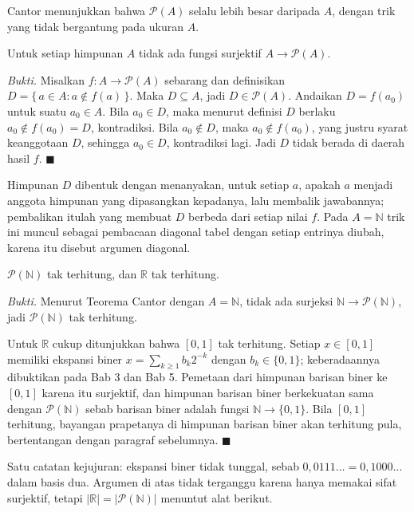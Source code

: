 Cantor menunjukkan bahwa $\mathcal{P}(A)$ selalu lebih besar daripada $A$, dengan trik
yang tidak bergantung pada ukuran $A$.

\begin{teorema}[Cantor]
Untuk setiap himpunan $A$ tidak ada fungsi surjektif $A \to \mathcal{P}(A)$.
\end{teorema}
\par\smallskip\noindent\textit{Bukti.} Misalkan $f : A \to \mathcal{P}(A)$ sebarang
dan definisikan $D = \{\, a \in A : a \notin f(a) \,\}$. Maka $D \subseteq A$, jadi
$D \in \mathcal{P}(A)$. Andaikan $D = f(a_0)$ untuk suatu $a_0 \in A$. Bila
$a_0 \in D$, maka menurut definisi $D$ berlaku $a_0 \notin f(a_0) = D$, kontradiksi.
Bila $a_0 \notin D$, maka $a_0 \notin f(a_0)$, yang justru syarat keanggotaan $D$,
sehingga $a_0 \in D$, kontradiksi lagi. Jadi $D$ tidak berada di daerah hasil $f$.
\hfill$\blacksquare${\parfillskip=0pt\par}

Himpunan $D$ dibentuk dengan menanyakan, untuk setiap $a$, apakah $a$ menjadi anggota
himpunan yang dipasangkan kepadanya, lalu membalik jawabannya; pembalikan itulah yang
membuat $D$ berbeda dari setiap nilai $f$. Pada $A = \mathbb{N}$ trik ini muncul sebagai
pembacaan diagonal tabel dengan setiap entrinya diubah, karena itu disebut argumen
diagonal.

\begin{akibat}
$\mathcal{P}(\mathbb{N})$ tak terhitung, dan $\mathbb{R}$ tak terhitung.
\end{akibat}
\par\smallskip\noindent\textit{Bukti.} Menurut Teorema Cantor dengan $A = \mathbb{N}$,
tidak ada surjeksi $\mathbb{N} \to \mathcal{P}(\mathbb{N})$, jadi
$\mathcal{P}(\mathbb{N})$ tak terhitung.

Untuk $\mathbb{R}$ cukup ditunjukkan bahwa $[0,1]$ tak terhitung. Setiap $x \in [0,1]$
memiliki ekspansi biner $x = \sum_{k \ge 1} b_k 2^{-k}$ dengan $b_k \in \{0,1\}$;
keberadaannya dibuktikan pada Bab 3 dan Bab 5. Pemetaan dari himpunan barisan biner ke
$[0,1]$ karena itu surjektif, dan himpunan barisan biner berkekuatan sama dengan
$\mathcal{P}(\mathbb{N})$ sebab barisan biner adalah fungsi $\mathbb{N} \to \{0,1\}$.
Bila $[0,1]$ terhitung, bayangan prapetanya di himpunan barisan biner akan terhitung
pula, bertentangan dengan paragraf sebelumnya.
\hfill$\blacksquare${\parfillskip=0pt\par}

Satu catatan kejujuran: ekspansi biner tidak tunggal, sebab
$0{,}0111\dots = 0{,}1000\dots$ dalam basis dua. Argumen di atas tidak terganggu karena
hanya memakai sifat surjektif, tetapi $|\mathbb{R}| = |\mathcal{P}(\mathbb{N})|$
menuntut alat berikut.

